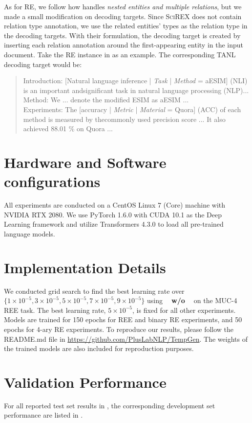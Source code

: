 \documentclass[11pt]{article}
\begin{document}
As for RE, we follow how \citet{paolini2021structured} handles \textit{nested entities and multiple relations}, but we made a small modification on decoding targets. Since \textsc{SciREX} does not contain relation type annotation, we use the related entities' types as the relation type in the decoding targets. With their formulation, the decoding target is created by inserting each relation annotation around the first-appearing entity in the input document. Take the RE instance in  as an example. The corresponding TANL decoding target would be:

\begin{quote}
    Introduction: [Natural language inference | \textit{Task} | \textit{Method} = aESIM] (NLI) is an important andsignificant task in natural language processing (NLP)... \\
    Method: We ... denote the modified ESIM as aESIM ...\\
    Experiments: The [accuracy | \textit{Metric} | \textit{Material} = Quora] (ACC) of each method is measured by thecommonly used precision score ... It also achieved 88.01 \% on Quora ...
\end{quote}




\section{Hardware and Software configurations}
All experiments are conducted on a CentOS Linux 7 (Core) machine with NVIDIA RTX 2080. We use PyTorch 1.6.0 with CUDA 10.1 as the Deep Learning framework and utilize Transformers 4.3.0 to load all pre-trained language models. 

\section{Implementation Details}
We conducted grid search to find the best learning rate over $\{1\times 10^{-5}, 3\times 10^{-5}, 5\times 10^{-5}, 7\times 10^{-5}, 9\times 10^{-5}\}$ using \textbf{\modelshort~ w/o \topkcopy~} on the MUC-4 REE task. The best learning rate, $5\times 10^{-5}$, is fixed for all other experiments. Models are trained for 150 epochs for REE and binary RE experiments, and 50 epochs for 4-ary RE experiments. To reproduce our results, please follow the README.md file in \url{https://github.com/PlusLabNLP/TempGen}. The weights of the trained models are also included for reproduction purposes.

\section{Validation Performance}
For all reported test set results in , the corresponding development set performance are listed in .

 
\end{document}
